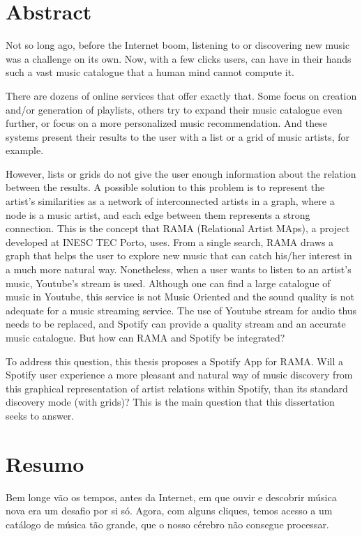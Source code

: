 
\chapter*{Abstract}

Not so long ago, before the Internet boom, listening to or discovering new music was a challenge on its own.
Now, with a few clicks users, can have in their hands such a vast music catalogue that a human mind cannot compute it.

There are dozens of online services that offer  exactly that.
Some focus on creation and/or generation of playlists, others try to expand their music catalogue even further, or focus on a more personalized music recommendation.
And these systems present their results to the user with a list or a grid of music artists, for example.

However, lists or grids do not give the user enough information about the relation between the results.
A possible solution to this problem is to represent the artist's similarities as a network of interconnected artists in a graph, where a node is a music artist, and each edge between them represents a strong connection.
This is the concept that RAMA (Relational Artist MAps), a project developed at INESC TEC Porto, uses.
From a single search, RAMA draws a graph that helps the user to explore new music that can catch his/her interest in a much more natural way.
Nonetheless, when a user wants to listen to an artist's music, Youtube's stream is used.
Although one can find a large catalogue of music in Youtube, this service is not Music Oriented and the sound quality is not adequate for a music streaming service.
The use of Youtube stream for audio thus needs to be replaced, and Spotify can provide a quality stream and an accurate music catalogue.
But how can RAMA and Spotify be integrated?

To address this question, this thesis proposes a Spotify App for RAMA.
Will a Spotify user experience a more pleasant and natural way of music discovery from this graphical representation of artist relations within Spotify, than its standard discovery mode (with grids)?
This is the main question that this dissertation seeks to answer.

\chapter*{Resumo}

Bem longe vão os tempos, antes da Internet, em que ouvir e descobrir música nova era um desafio por si só.
Agora, com alguns cliques, temos acesso a um catálogo de música tão grande, que o nosso cérebro não consegue processar.

